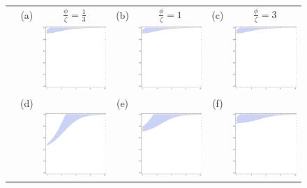 \documentclass[a4paper]{article}
\begin{document}
\begin{figure}[th]
\centering
\begin{tabular}{lcccccc}
 &(a)&$\frac{\phi}{\zeta}=\frac{1}{3}$&(b)&$\frac{\phi}{\zeta}=1$&(c)&$\frac{\phi}{\zeta}=3$\\
 && \includegraphics[width=1.5in]{fdphizeta1over3.pdf} && \includegraphics[width=1.5in]{fdphizeta1.pdf} && \includegraphics[width=1.5in]{fdphizeta1over3.pdf} \\
 &(d)&&(e)&&(f)&\\
 && \includegraphics[width=1.5in]{gdphizeta1over3.pdf} && \includegraphics[width=1.5in]{gdphizeta1.pdf} && \includegraphics[width=1.5in]{gdphizeta3.pdf} \\

\end{tabular}
\end{figure}
\end{document}
